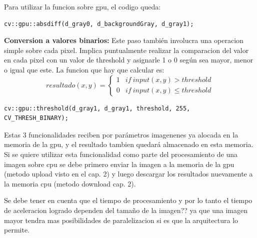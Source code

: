 \documentclass[a4paper,10pt]{report}
\begin{document}
 Para utilizar la funcion sobre gpu, el codigo queda:
\begin{lstlisting}[columns=flexible,basicstyle=\ttfamily\small\bfseries]
    cv::gpu::absdiff(d_gray0, d_backgroundGray, d_gray1);
\end{lstlisting}





 \textbf{Conversion a valores binarios:}  Este paso también involucra una operacion simple sobre cada pixel. 
 Implica puntualmente realizar la comparacion del valor en cada pixel con un valor de threshold y asignarle 1 o 0 según sea mayor, menor o igual que este.
 La funcion que hay que calcular es: 
 \begin{displaymath}
   resultado(x,y) = \left\{
     \begin{array}{lr}
       1 &  if\ input(x,y) > threshold\\
       0 &  if\ input(x,y) \leq threshold
     \end{array}
   \right.
\end{displaymath} 



 \begin{lstlisting}[columns=flexible,basicstyle=\ttfamily\small\bfseries]
cv::gpu::threshold(d_gray1, d_gray1, threshold, 255, CV_THRESH_BINARY);
\end{lstlisting}


 
 
 Estas 3 funcionalidades reciben por parámetros imagenenes ya alocada en la memoria de la gpu, y el resultado tambien quedará almacenado en esta memoria.
Si se quiere utilizar esta funcionalidad como parte del procesamiento de una imagen sobre cpu se debe primero enviar la imagen a la memoria de la gpu (metodo upload visto en el cap. 2)
y luego descargar los resultados nuevamente a la memoria cpu (metodo download cap. 2).
 
 Se debe tener en cuenta que el tiempo de procesamiento y por lo tanto el tiempo de aceleracion logrado dependen del tamaño de la imagen?? 
 ya que una imagen mayor tendra mas posibilidades de paralelizacion si es que la arquitectura lo permite.
\end{document}
